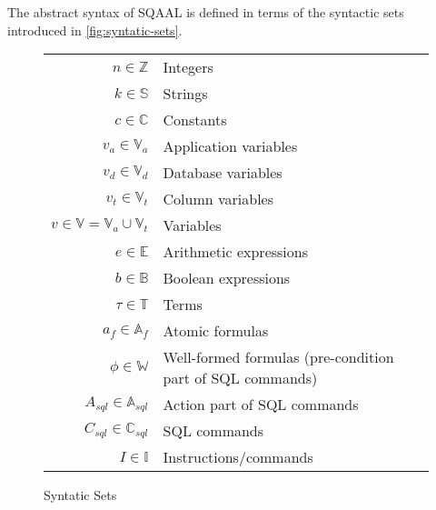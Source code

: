 The abstract syntax of SQAAL is defined in terms of the syntactic sets introduced in \autoref{fig:syntatic-sets}.
\begin{figure}[htb!]
     \center
    \begin{tabular}{r p{ }}
    $n \in \mathbb{Z}$                          & Integers                                                   \\
    $k \in \mathbb{S}$                                  & Strings                                                    \\
    $c \in \mathbb{C}$                          & Constants                                                 \\
    $v_a \in \mathbb{V}_a$                      & Application variables                                     \\
    $v_d \in \mathbb{V}_d$                      & Database variables \\
    $v_t \in \mathbb{V}_t$                    & Column variables   \\
    $v \in \mathbb{V} = \mathbb{V}_a \cup \mathbb{V}_t$ & Variables                                                 \\
    $e \in \mathbb{E}$                          & Arithmetic expressions                                    \\
    $b \in \mathbb{B}$                          & Boolean expressions                                       \\
    $\tau \in \mathbb{T}$                       & Terms                                                     \\
    $a_f \in \mathbb{A}_f$                      & Atomic formulas                                           \\
    $\phi  \in \mathbb{W}$                      & Well-formed formulas (pre-condition part of SQL commands) \\
    $A_{sql} \in \mathbb{A}_{sql}$              & Action part of SQL commands                               \\
    $C_{sql} \in \mathbb{C}_{sql}$              & SQL commands                                              \\
    $I \in \mathbb{I}$                          & Instructions/commands                                     \\
    \end{tabular}
    \caption{Syntatic Sets}
    \label{fig:syntatic-sets}
\end{figure}

